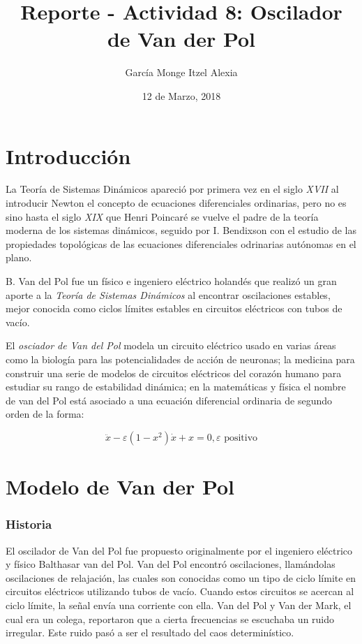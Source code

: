 \documentclass{article}
\title{Reporte - Actividad 8: Oscilador de Van der Pol}
\author{García Monge Itzel Alexia}
\date{12 de Marzo, 2018}
\begin{document}
\maketitle
\section{Introducción}
La Teoría de Sistemas Dinámicos apareció por primera vez en el siglo \textit{XVII} al introducir Newton el concepto de ecuaciones diferenciales ordinarias, pero no es sino hasta el siglo \textit{XIX} que Henri Poincaré se vuelve el padre de la teoría moderna de los sistemas dinámicos, seguido por I. Bendixson con el estudio de las propiedades topológicas de las ecuaciones diferenciales odrinarias autónomas en el plano.

 B. Van del Pol fue un físico e ingeniero eléctrico holandés que realizó un gran aporte a la \textit{Teoría de Sistemas Dinámicos} al encontrar oscilaciones estables, mejor conocida como ciclos límites estables en circuitos eléctricos con tubos de vacío.

El \textit{osciador de Van del Pol} modela un circuito eléctrico usado en varias áreas como la biología para las potencialidades de acción de neuronas; la medicina para construir una serie de modelos de circuitos eléctricos del corazón humano para estudiar su rango de estabilidad dinámica; en la matemáticas y física el nombre de van del Pol está asociado a una ecuación diferencial ordinaria de segundo orden de la forma:

\[\ddot{x} - \varepsilon (1 - x^2) \dot{x} + x = 0 , \varepsilon \text{   positivo} \]

\section{Modelo de Van der Pol}
\subsubsection{Historia}
El oscilador de Van del Pol fue propuesto originalmente por el ingeniero eléctrico y físico Balthasar van del Pol. Van del Pol encontró oscilaciones, llamándolas oscilaciones de relajación, las cuales son conocidas como un tipo de ciclo límite en circuitos eléctricos utilizando tubos de vacío. Cuando estos circuitos se acercan al ciclo límite, la señal envía una corriente con ella. Van del Pol y Van der Mark, el cual era un colega, reportaron que a cierta frecuencias se escuchaba un ruido irregular. Este ruido pasó a ser el resultado del caos determinístico.
\end{document}
